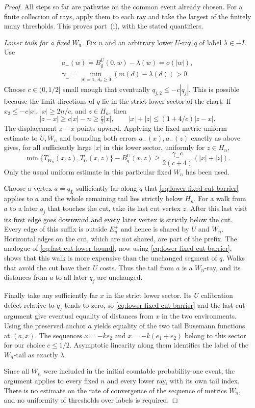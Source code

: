 \begin{proof}
All steps so far are pathwise on the common event already chosen.
For a finite collection of rays, apply them to each ray and take
the largest of the finitely many thresholds.  This proves
part~(i), with the stated quantifiers.

\emph{Lower tails for a fixed $W_n$.}
Fix $n$ and an arbitrary lower $U$-ray $q$ of label $\lambda\in-I$.
Use
\begin{gather*}
 a_-(w)=B_q^U(0,w)-\lambda(w)=o(|w|),\\
 \gamma_-=\min_{|d|=1,\ d_2\ge0}(m(d)-\lambda(d))>0.
\end{gather*}
Choose $c\in(0,1/2]$ small enough that eventually
$q_{j,2}\le-c|q_j|$.  This is possible because the limit directions
of $q$ lie in the strict lower sector of the chart.  If
$x_2\le-c|x|$, $|x|\ge2n/c$, and $z\in H_n$, then
\[
 |z-x|\ge c|x|-n\ge\tfrac c2|x|,
 \qquad |x|+|z|\le(1+4/c)|z-x|.
\]
The displacement $z-x$ points upward.  Applying the fixed-metric
uniform estimate to $U,W_n$ and bounding both errors
$a_-(x),a_-(z)$ exactly as above gives, for all sufficiently large
$|x|$ in this lower sector, uniformly for $z\in H_n$,
\begin{equation}
 \min\{T_{W_n}(x,z),T_U(x,z)\}-B_q^U(x,z)
 \ge\frac{\gamma_-c}{2(c+4)}(|x|+|z|).
 \label{eq:lower-fixed-cut-barrier}
\end{equation}
Only the usual uniform estimate in this particular fixed $W_n$ has
been used.

Choose a vertex $a=q_L$ sufficiently far along $q$ that
\eqref{eq:lower-fixed-cut-barrier} applies to $a$ and the whole
remaining tail lies strictly below $H_n$.  For a walk from $a$ to
a later $q_j$ that touches the cut, take its last cut vertex $z$.
After this last visit its first edge goes downward and every later
vertex is strictly below the cut.  Every edge of this suffix is
outside $E_n^+$ and hence is shared by $U$ and $W_n$.  Horizontal
edges on the cut, which are not shared, are part of the prefix.
The analogue of \eqref{eq:last-cut-lower-bound}, now using
\eqref{eq:lower-fixed-cut-barrier}, shows that this walk is more
expensive than the unchanged segment of $q$.  Walks that avoid the
cut have their $U$ costs.  Thus the tail from $a$ is a $W_n$-ray,
and its distances from $a$ to all later $q_j$ are unchanged.

Finally take any sufficiently far $x$ in the strict lower sector.
Its $U$ calibration defect relative to $q_j$ tends to zero, so
\eqref{eq:lower-fixed-cut-barrier} and the last-cut argument give
eventual equality of distances from $x$ in the two environments.
Using the preserved anchor $a$ yields equality of the two tail
Busemann functions at $(a,x)$.  The sequences $x=-ke_2$ and
$x=-k(e_1+e_2)$ belong to this sector for our choice $c\le1/2$.
Asymptotic linearity along them identifies the label of the
$W_n$-tail as exactly $\lambda$.

Since all $W_n$ were included in the initial countable
probability-one event, the argument applies to every fixed $n$ and
every lower ray, with its own tail index.  There is no estimate on
the rate of convergence of the sequence of metrics $W_n$, and no
uniformity of thresholds over labels is required.
\end{proof}

